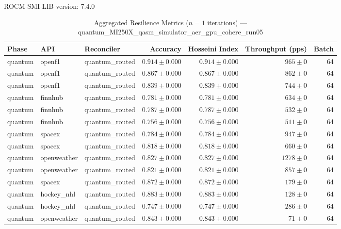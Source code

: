 ROCM-SMI-LIB version: 7.4.0

\begin{table}[htbp]
\caption{Aggregated Resilience Metrics ($n=1$ iterations) --- quantum_MI250X_qasm_simulator_aer_gpu_cohere_run05}
\begin{tabular}{l l l r r r r}
\hline
Phase & API & Reconciler & Accuracy & Hosseini Index & Throughput (pps) & Batch \\
\hline
quantum & openf1 & quantum\_routed & $0.914\pm0.000$ & $0.914\pm0.000$ & $965\pm0$ & 64 \\
quantum & openf1 & quantum\_routed & $0.867\pm0.000$ & $0.867\pm0.000$ & $862\pm0$ & 64 \\
quantum & openf1 & quantum\_routed & $0.839\pm0.000$ & $0.839\pm0.000$ & $744\pm0$ & 64 \\
quantum & finnhub & quantum\_routed & $0.781\pm0.000$ & $0.781\pm0.000$ & $634\pm0$ & 64 \\
quantum & finnhub & quantum\_routed & $0.787\pm0.000$ & $0.787\pm0.000$ & $532\pm0$ & 64 \\
quantum & finnhub & quantum\_routed & $0.756\pm0.000$ & $0.756\pm0.000$ & $511\pm0$ & 64 \\
quantum & spacex & quantum\_routed & $0.784\pm0.000$ & $0.784\pm0.000$ & $947\pm0$ & 64 \\
quantum & spacex & quantum\_routed & $0.818\pm0.000$ & $0.818\pm0.000$ & $660\pm0$ & 64 \\
quantum & openweather & quantum\_routed & $0.827\pm0.000$ & $0.827\pm0.000$ & $1278\pm0$ & 64 \\
quantum & openweather & quantum\_routed & $0.821\pm0.000$ & $0.821\pm0.000$ & $857\pm0$ & 64 \\
quantum & spacex & quantum\_routed & $0.872\pm0.000$ & $0.872\pm0.000$ & $179\pm0$ & 64 \\
quantum & hockey\_nhl & quantum\_routed & $0.883\pm0.000$ & $0.883\pm0.000$ & $128\pm0$ & 64 \\
quantum & hockey\_nhl & quantum\_routed & $0.747\pm0.000$ & $0.747\pm0.000$ & $286\pm0$ & 64 \\
quantum & openweather & quantum\_routed & $0.843\pm0.000$ & $0.843\pm0.000$ & $71\pm0$ & 64 \\

\end{tabular}
\end{table}
